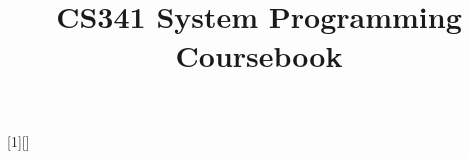 \usepackage[Bjornstrup]{fncychap}
\singlespacing
\title{\vspace{-15mm}\fontsize{24pt}{10pt}\selectfont\textbf{CS341 System Programming Coursebook}}
\date{}

\newcommand{\keyword}[1]{\underline{\smash{\textbf{\texttt{#1}}}}}
\newcommand{\todo}[1]{}
\renewcommand{\todo}[1]{{\color{red} TODO: {#1}}}
[1][]%
  {\noindent\minipage{\linewidth}\medskip
   \lstset{basicstyle=\ttfamily\footnotesize,frame=single,#1}}
  {\endminipage}

\newenvironment{proof}{\begin{shaded*}\paragraph{Proof:}}{\hfill$\square$\end{shaded*}}
\newenvironment{tableau}{\begin{shaded*}\begin{longtable}}{\end{longtable}\end{shaded*}}
\usepackage{wrapfig}


\usepackage{csquotes}

  {\noindent\minipage{\linewidth}\medskip 
   \lstset{basicstyle=\ttfamily\footnotesize,frame=single,language=#1}}
  {\endminipage}

\usepackage{float}


\usepackage[compact]{titlesec}

\renewcommand{\baselinestretch}{1.15}
